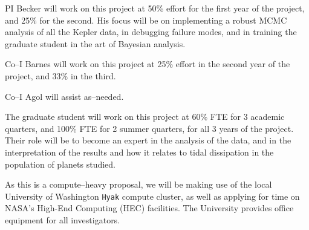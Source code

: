 \pagebreak

\bigskip {}

PI Becker will work on this project at 50\% effort for the first
year of the project, and 25\% for the second.  His focus will be on
implementing a robust MCMC analysis of all the Kepler data, in
debugging failure modes, and in training the graduate student in the
art of Bayesian analysis.

Co--I Barnes will work on this project at 25\% effort in the second
year of the project, and 33\% in the third.

Co--I Agol will assist as--needed.

The graduate student will work on this project at 60\% FTE for 3
academic quarters, and 100\% FTE for 2 summer quarters, for all 3
years of the project. Their role will be to become an expert in the
analysis of the data, and in the interpretation of the results and how
it relates to tidal dissipation in the population of planets studied.

\bigskip {}

As this is a compute--heavy proposal, we will be making use of the
local University of Washington {\tt Hyak} compute cluster, as well as
applying for time on NASA's High-End Computing (HEC) facilities.  The
University provides office equipment for all investigators.
